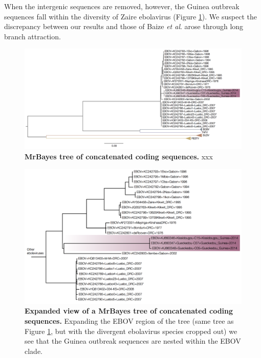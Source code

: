 \documentclass[11pt,oneside,letterpaper]{article}
\begin{document}
When the intergenic sequences are removed, however, the Guinea outbreak sequences fall within the diversity of Zaire ebolavirus (Figure \ref{MBtreeCDS}).
We suspect the discrepancy between our results and those of Baize \textit{et al}. \cite{baize2014} arose through long branch attraction.
\begin{figure}[h!]
\centering  
\includegraphics[width=1\textwidth]  {figures/ebolavirus_cds_mb_tree.png}
\caption{\textbf{MrBayes tree of concatenated coding sequences.}
xxx}
\label{MBtreeCDS}
\end{figure}

\begin{figure}[h!]
\centering  
\includegraphics[width=1\textwidth]  {figures/EBOV_cds_mb_tree.png}
\caption{\textbf{Expanded view of a MrBayes tree of concatenated coding sequences.}
Expanding the EBOV region of the tree (same tree as Figure \ref{MBtreeCDS}, but with the divergent ebolavirus species cropped out) we see that the Guinea outbreak sequences are nested within the EBOV clade.}
\label{MBtreeCDSzoomed}
\end{figure}
\end{document}

